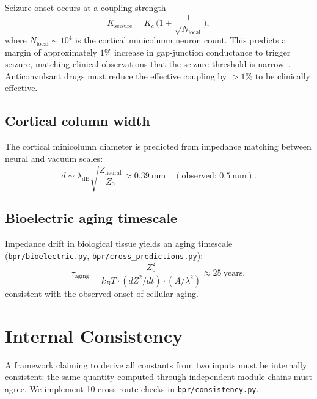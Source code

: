 \documentclass[aps,prd,twocolumn,superscriptaddress,longbibliography,nofootinbib]{revtex4-2}
\newcommand{\Zimp}{Z}
\newcommand{\Zvac}{Z_0}
\begin{document}
Seizure onset occurs at a coupling strength
\begin{equation}
K_{\mathrm{seizure}} = K_c\,\biggl(1 +
  \frac{1}{\sqrt{N_{\mathrm{local}}}}\biggr),
\label{eq:seizure}
\end{equation}
where $N_{\mathrm{local}} \sim 10^4$ is the cortical minicolumn
neuron count.  This predicts a margin of approximately $1\%$
increase in gap-junction conductance to trigger seizure, matching
clinical observations that the seizure threshold is
narrow~\cite{Breakspear2006}.  Anticonvulsant drugs must reduce the
effective coupling by $> 1\%$ to be clinically effective.

\subsection{Cortical column width}

The cortical minicolumn diameter is predicted from impedance
matching between neural and vacuum scales:
\begin{equation}
d \sim \lambda_{\mathrm{dB}} \sqrt{\frac{\Zimp_{\mathrm{neural}}}{\Zvac}}
\approx 0.39~\text{mm}
\quad (\text{observed: } 0.5~\text{mm}).
\label{eq:cortical}
\end{equation}

\subsection{Bioelectric aging timescale}

Impedance drift in biological tissue yields an aging timescale
(\texttt{bpr/bioelectric.py}, \texttt{bpr/cross\_predictions.py}):
\begin{equation}
\tau_{\mathrm{aging}} = \frac{\Zvac^2}
  {k_B T \cdot (d\Zimp^2/dt) \cdot (A/\lambda^2)}
\approx 25~\text{years},
\label{eq:aging}
\end{equation}
consistent with the observed onset of cellular aging.


\section{Internal Consistency}
\label{sec:consistency}

A framework claiming to derive all constants from two inputs must be
internally consistent: the same quantity computed through independent
module chains must agree.  We implement 10 cross-route checks in
\texttt{bpr/consistency.py}.
\end{document}
